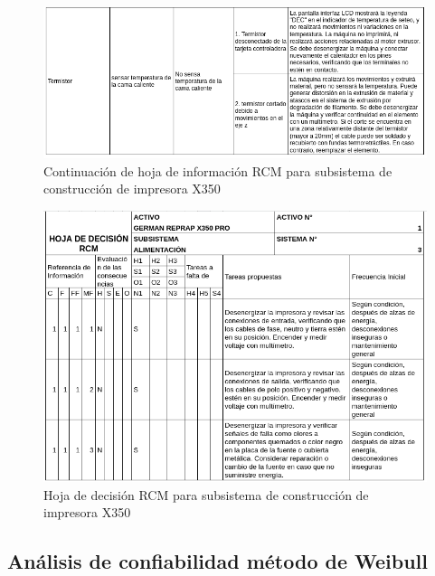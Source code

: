 \begin{figure}[H]
\centering
\includegraphics[scale=0.7]{images/amef52.png}
\caption{Continuación de hoja de información RCM para subsistema de construcción de impresora X350}
\end{figure}


\begin{figure}[H]
\centering
\includegraphics[scale=0.7]{images/decision41.png}
\caption{Hoja de decisión RCM para subsistema de construcción de impresora X350}
\end{figure}

\subsection{Análisis de confiabilidad método de Weibull}

